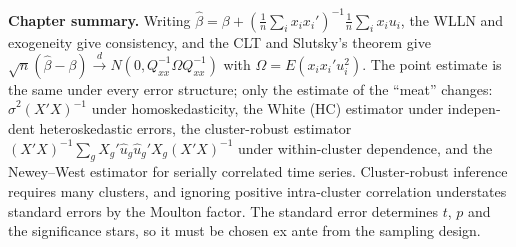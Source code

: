 \begin{english}
\textbf{Chapter summary.} Writing $\hat\beta=\beta+(\frac1n\sum_i x_ix_i')^{-1}\frac1n\sum_i x_iu_i$, the WLLN and exogeneity give consistency, and the CLT and Slutsky's theorem give $\sqrt n(\hat\beta-\beta)\xrightarrow{d}N(0,Q_{xx}^{-1}\Omega Q_{xx}^{-1})$ with $\Omega=E(x_ix_i'u_i^2)$. The point estimate is the same under every error structure; only the estimate of the ``meat'' changes: $\hat\sigma^2(X'X)^{-1}$ under homoskedasticity, the White (HC) estimator under independent heteroskedastic errors, the cluster-robust estimator $(X'X)^{-1}\sum_g X_g'\hat u_g\hat u_g'X_g(X'X)^{-1}$ under within-cluster dependence, and the Newey--West estimator for serially correlated time series. Cluster-robust inference requires many clusters, and ignoring positive intra-cluster correlation understates standard errors by the Moulton factor. The standard error determines $t$, $p$ and the significance stars, so it must be chosen ex ante from the sampling design.
\end{english}
